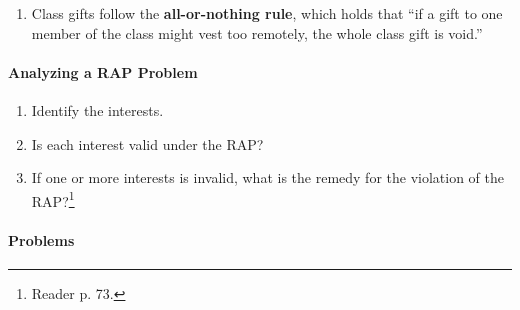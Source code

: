 \begin{enumerate}
\begin{enumerate}
        first child to reach 25.'' The interest will not necessarily vest 
        before after A's life plus 21 years. Thus, the remainder is invalid.
        \item The ``presumption of life fertility'' assumes that anyone can 
        have a child at any time---hence the ``fertile octogenarian'' and the 
        ``precocious toddler.''\footnote{Casebook p. 288.}
    \end{enumerate}
    \item Class gifts follow the \textbf{all-or-nothing rule}, which holds 
    that ``if a gift to one member of the class might vest too remotely, the 
    whole class gift is void.'' %
\end{enumerate}

\paragraph{Analyzing a RAP Problem}

\begin{enumerate}
    \item Identify the interests.
    \item Is each interest valid under the RAP?
    \item If one or more interests is invalid, what is the remedy for the 
    violation of the RAP?\footnote{Reader p. 73.}
\end{enumerate}

\paragraph{Problems}

